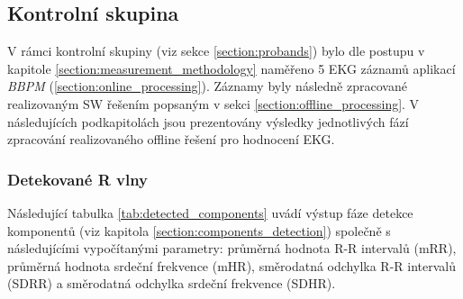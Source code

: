 \clearpage

\subsection{Kontrolní skupina}
\label{sections:results_probands}
V rámci kontrolní skupiny (viz sekce \ref{section:probands}) bylo dle postupu v
kapitole \ref{section:measurement_methodology} naměřeno 5 EKG záznamů aplikací
\textit{BBPM} (\ref{section:online_processing}). Záznamy byly následně
zpracované realizovaným SW řešením popsaným v sekci
\ref{section:offline_processing}. V následujících podkapitolách jsou
prezentovány výsledky jednotlivých fází zpracování realizovaného offline řešení
pro hodnocení EKG.

\subsubsection{Detekované R vlny}
Následující tabulka \ref{tab:detected_components} uvádí výstup fáze detekce
komponentů (viz kapitola \ref{section:components_detection}) společně s
následujícími vypočítanými parametry: průměrná hodnota R-R intervalů (mRR),
průměrná hodnota srdeční frekvence (mHR), směrodatná odchylka R-R intervalů
(SDRR) a směrodatná odchylka srdeční frekvence (SDHR).

